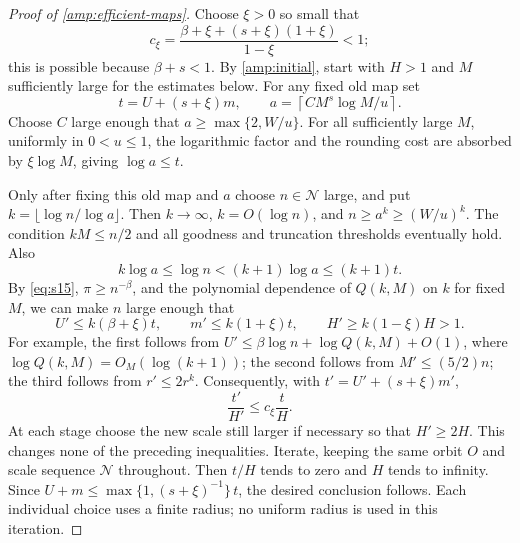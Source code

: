 \begin{proof}[Proof of \cref{amp:efficient-maps}]
Choose $\xi>0$ so small that
\[
 c_\xi=\frac{\beta+\xi+(s+\xi)(1+\xi)}{1-\xi}<1;
\]
this is possible because $\beta+s<1$.  By \cref{amp:initial}, start with
$H>1$ and $M$ sufficiently large for the estimates below.  For any fixed
old map set
\[
 t=U+(s+\xi)m,
 \qquad a=\left\lceil C M^s\log M/u\right\rceil.
\]
Choose $C$ large enough that $a\ge\max\{2,W/u\}$.  For all sufficiently
large $M$, uniformly in $0<u\le1$, the logarithmic factor and the
rounding cost are absorbed by $\xi\log M$, giving $\log a\le t$.

Only after fixing this old map and $a$ choose $n\in\mathcal N$ large,
and put $k=\lfloor\log n/\log a\rfloor$.  Then $k\to\infty$,
$k=O(\log n)$, and $n\ge a^k\ge(W/u)^k$.  The condition $kM\le n/2$
and all goodness and truncation thresholds eventually hold.  Also
\[
 k\log a\le\log n<(k+1)\log a\le(k+1)t.
\]
By \eqref{eq:s15}, $\pi\ge n^{-\beta}$, and the polynomial dependence
of $Q(k,M)$ on $k$ for fixed $M$, we can make $n$ large enough that
\[
 U'\le k(\beta+\xi)t,\qquad
 m'\le k(1+\xi)t,\qquad
 H'\ge k(1-\xi)H>1.
\]
For example, the first follows from
$U'\le\beta\log n+\log Q(k,M)+O(1)$, where
$\log Q(k,M)=O_M(\log(k+1))$; the second follows from
$M'\le(5/2)n$; the third follows from $r'\le2r^k$.
Consequently, with $t'=U'+(s+\xi)m'$,
\[
 \frac{t'}{H'}\le c_\xi\frac tH.
\]
At each stage choose the new scale still larger if necessary so that
$H'\ge2H$.  This changes none of the preceding inequalities.  Iterate,
keeping the same orbit $O$ and scale sequence $\mathcal N$ throughout.
Then $t/H$ tends to zero and $H$ tends to infinity.  Since
$U+m\le\max\{1,(s+\xi)^{-1}\}\,t$, the desired conclusion follows.
Each individual choice uses a finite radius; no uniform radius is used
in this iteration.
\end{proof}
